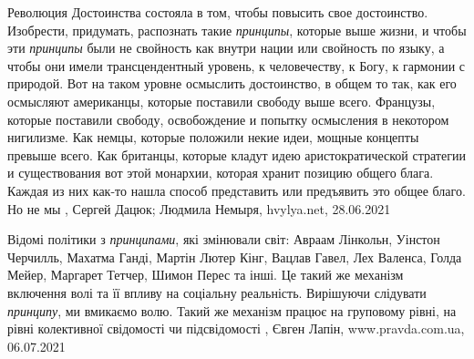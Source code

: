 Революция Достоинства состояла в том, чтобы повысить свое достоинство.
Изобрести, придумать, распознать такие \emph{принципы}, которые выше жизни, и
чтобы эти \emph{принципы} были не свойность как внутри нации или свойность по
языку, а чтобы они имели трансцендентный уровень, к человечеству, к Богу, к
гармонии с природой. Вот на таком уровне осмыслить достоинство, в общем то так,
как его осмысляют американцы, которые поставили свободу выше всего. Французы,
которые поставили свободу, освобождение и попытку осмысления в некотором
нигилизме. Как немцы, которые положили некие идеи, мощные концепты превыше
всего. Как британцы, которые кладут идею аристократической стратегии и
существования вот этой монархии, которая хранит позицию общего блага. Каждая из
них как-то нашла способ представить или предъявить это общее благо. Но не мы
, 
Сергей Дацюк; Людмила Немыря, hvylya.net, 28.06.2021

Відомі політики з \emph{принципами}, які змінювали світ: Авраам Лінкольн,
Уінстон Черчилль, Махатма Ганді, Мартін Лютер Кінг, Вацлав Гавел, Лех Валенса,
Голда Мейер, Маргарет Тетчер, Шимон Перес та інші. Це такий же механізм
включення волі та її впливу на соціальну реальність.  Вирішуючи слідувати
\emph{принципу}, ми вмикаємо волю.  Такий же механізм працює на груповому
рівні, на рівні колективної свідомості чи підсвідомості
, 
Євген Лапін, www.pravda.com.ua, 06.07.2021
